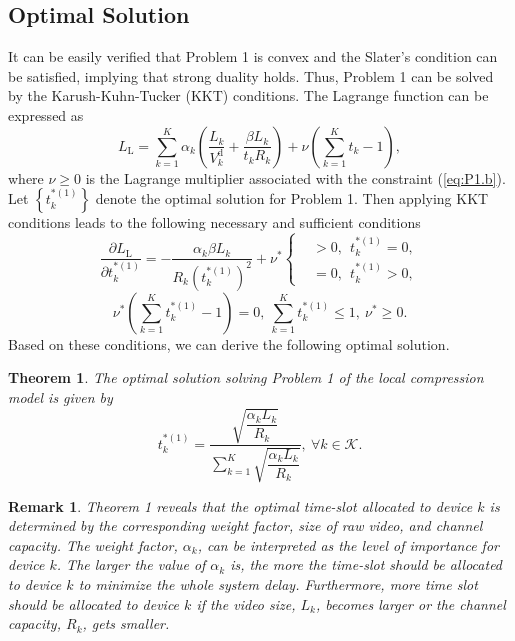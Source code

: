 \documentclass[journal,draftcls,onecolumn,12pt,twoside]{IEEEtran}
\newtheorem{thm}{Theorem}
\newtheorem{rem}{Remark}
\begin{document}
\subsection{Optimal Solution}
It can be easily verified that Problem 1 is convex and the Slater's condition can be satisfied, implying that strong duality holds. Thus, Problem 1 can be solved by the Karush-Kuhn-Tucker (KKT) conditions. The Lagrange function can be expressed as
\begin{equation}
    L_{\text{L}} = \sum_{k=1}^K \alpha_k \left(\frac{L_k}{V_k^{\text{d}}} + \frac{\beta L_k}{t_k R_k}\right) + \nu \left( \sum_{k=1}^K t_k - 1 \right), \label{7}
\end{equation}
where $\nu \ge 0$ is the Lagrange multiplier associated with the constraint (\ref{eq:P1.b}). Let $\left\{t_k^{*(1)}\right\}$ denote the optimal solution for Problem 1. Then applying KKT conditions leads to the following necessary and sufficient conditions
\begin{equation}
    \frac{\partial L_{\text{L}}}{\partial t_k^{*(1)}} = -\frac{\alpha_k \beta L_k}{R_k \left( t_k^{*(1)} \right)^2 }+\nu^*
    \left\{ \begin{aligned}
            &>0,~~t_k^{*(1)}=0,\\
            &=0,~~t_k^{*(1)}>0,
            \end{aligned}
    \right. \label{8}
\end{equation}
\begin{equation}
    \nu^*\left(\sum_{k=1}^K t_k^{*(1)} - 1\right)=0,~\sum_{k=1}^K t_k^{*(1)} \le 1,~\nu^*\ge 0. \label{9}
\end{equation}
Based on these conditions, we can derive the following optimal solution.
\begin{thm}
The optimal solution solving Problem 1 of the local compression model is given by
\begin{equation}
     t_k^{*(1)}=\dfrac{\sqrt{\dfrac{\alpha_k L_k}{R_k}}}{\sum_{k=1}^K{\sqrt{\dfrac{\alpha_k L_k}{R_k}}}},~\forall k \in \mathcal{K}. \label{10}
\end{equation}
\end{thm}
\begin{rem}
Theorem 1 reveals that the optimal time-slot allocated to device $k$ is determined by the corresponding weight factor, size of raw video, and channel capacity. The weight factor, $\alpha_k$, can be interpreted as the level of importance for device $k$. The larger the value of $\alpha_k$ is, the more the time-slot should be allocated to device $k$ to minimize the whole system delay. Furthermore, more time slot should be allocated to device $k$ if the video size, $L_k$, becomes larger or the channel capacity, $R_k$, gets smaller.
\end{rem}
\end{document}
